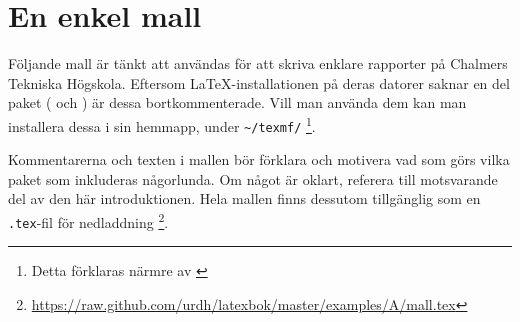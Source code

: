 \documentclass[10pt,../../a4.tex]{subfiles}
\begin{document}
\chapter{En enkel mall}\label{app:1}
Följande mall är tänkt att användas för att skriva enklare rapporter på
Chalmers Tekniska Högskola. Eftersom \LaTeX-installationen på deras
datorer saknar en del paket ( och ) är dessa
bortkommenterade. Vill man använda dem kan man installera dessa i
sin hemmapp, under \texttt{\textasciitilde/texmf/}%
\footnote{Detta förklaras närmre av \textcite[ss.~89–90]{Oetiker11}%
\hfill}.

Kommentarerna och texten i mallen bör förklara och motivera vad som görs
vilka paket som inkluderas någorlunda. Om något är oklart, referera till
motsvarande del av den här introduktionen. Hela mallen finns dessutom
tillgänglig som en \texttt{.tex}-fil för nedladdning%
\footnote{\url{https://raw.github.com/urdh/latexbok/master/examples/A/mall.tex}}.

%
\end{document}
